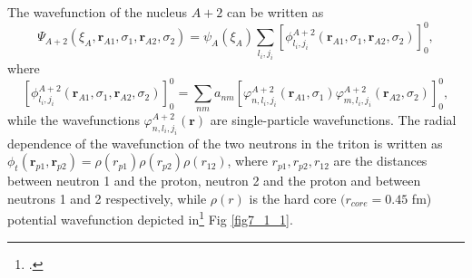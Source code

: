 The wavefunction of the nucleus $A+2$ can be written as 
\begin{equation}\label{eq7_1_1}
\Psi_{A+2}(\xi_A,\mathbf r_{A1},\sigma_1,\mathbf r_{A2},\sigma_2)=\psi_A(\xi_A)\sum_{l_i,j_i}[\phi^{A+2}_{l_i,j_i}(\mathbf r_{A1},\sigma_1,\mathbf r_{A2},\sigma_2)]^0_0,
\end{equation} 
where 
\begin{equation}\label{eq7_1_2}
[\phi^{A+2}_{l_i,j_i}(\mathbf r_{A1},\sigma_1,\mathbf r_{A2},\sigma_2)]^0_0=\sum_{nm}a_{nm}\left[\varphi^{A+2}_{n,l_i,j_i}(\mathbf r_{A1},\sigma_1)\varphi^{A+2}_{m,l_i,j_i}(\mathbf r_{A2},\sigma_2)\right]^0_0,
\end{equation} 
while the wavefunctions $\varphi^{A+2}_{n,l_i,j_i}(\mathbf r)$ are single-particle wavefunctions.
 The radial dependence of the  wavefunction of the two neutrons in the triton is written as $\phi_t(\mathbf r_{p1},\mathbf r_{p2})=\rho(r_{p1})\rho(r_{p2})\rho(r_{12})$, where $r_{p1},r_{p2},r_{12}$ are the distances between neutron 1 and the proton, neutron 2 and the proton and between neutrons 1 and 2 respectively, while $\rho(r)$ is the hard core $(r_{core}=0.45$ fm) potential  wavefunction  depicted in\footnote{\cite{Tang:65}.} Fig \ref{fig7_1_1}.
 

